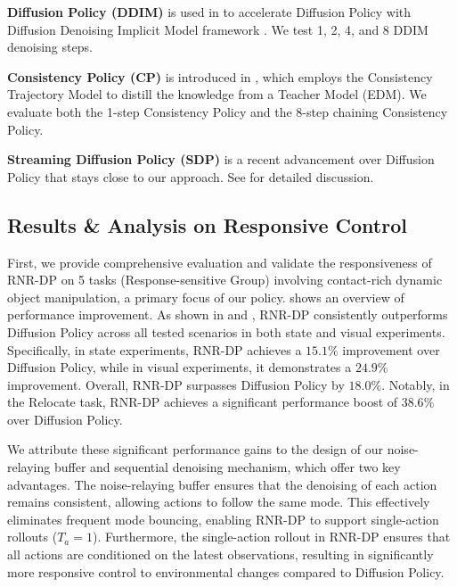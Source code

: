\textbf{Diffusion Policy (DDIM)} is used in \citet{chi2023diffusion} to accelerate Diffusion Policy with Diffusion Denoising Implicit Model framework \citep{song2020denoising}. We test 1, 2, 4, and 8 DDIM denoising steps.

\textbf{Consistency Policy (CP)} is introduced in \citet{prasad2024consistency}, which employs the Consistency Trajectory Model \citep{kim2023consistency} to distill the knowledge from a Teacher Model (EDM). We evaluate both the 1-step Consistency Policy and the 8-step chaining Consistency Policy.

\textbf{Streaming Diffusion Policy (SDP)} is a recent advancement over Diffusion Policy that stays close to our approach. See  for detailed discussion.

\subsection{Results \& Analysis on Responsive Control}
\label{sec:main}

First, we provide comprehensive evaluation and validate the responsiveness of RNR-DP on 5 tasks (Response-sensitive Group) involving contact-rich dynamic object manipulation, a primary focus of our policy.  shows an overview of performance improvement. As shown in  and , RNR-DP consistently outperforms Diffusion Policy across all tested scenarios in both state and visual experiments. Specifically, in state experiments, RNR-DP achieves a \( 15.1\% \) improvement over Diffusion Policy, while in visual experiments, it demonstrates a \( 24.9\% \) improvement. Overall, RNR-DP surpasses Diffusion Policy by \( 18.0\% \). Notably, in the Relocate task, RNR-DP achieves a significant performance boost of \( 38.6\% \) over Diffusion Policy.

We attribute these significant performance gains to the design of our noise-relaying buffer and sequential denoising mechanism, which offer two key advantages. The noise-relaying buffer ensures that the denoising of each action remains consistent, allowing actions to follow the same mode. This effectively eliminates frequent mode bouncing, enabling RNR-DP to support single-action rollouts (\( T_a = 1 \)). Furthermore, the single-action rollout in RNR-DP ensures that all actions are conditioned on the latest observations, resulting in significantly more responsive control to environmental changes compared to Diffusion Policy.

